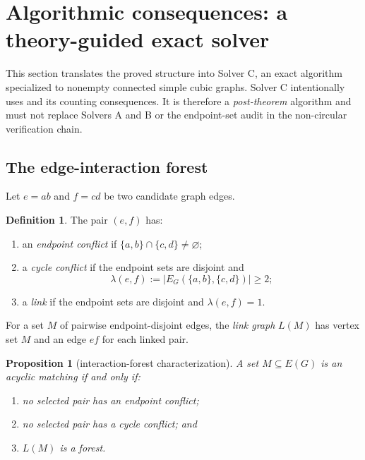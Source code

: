 \documentclass[smallextended,natbib,nospthms]{svjour3}
\newtheorem{proposition}[proposition]{Proposition}
\theoremstyle{definition}
\newtheorem{definition}[definition]{Definition}
\theoremstyle{remark}
\begin{document}
\section{Algorithmic consequences: a theory-guided exact solver}
\label{sec:solverc}

This section translates the proved structure into Solver C, an exact algorithm
specialized to nonempty connected simple cubic graphs. Solver C intentionally
uses  and its counting consequences. It is therefore a
\emph{post-theorem} algorithm and must not replace Solvers A and B or the
endpoint-set audit in the non-circular verification chain.

\subsection{The edge-interaction forest}

Let $e=ab$ and $f=cd$ be two candidate graph edges.
\begin{definition}
\label{def:interactions}
The pair $(e,f)$ has:
\begin{enumerate}[label=(\roman*),leftmargin=2em]
  \item an \emph{endpoint conflict} if
  $\{a,b\}\cap\{c,d\}\neq\varnothing$;
  \item a \emph{cycle conflict} if the endpoint sets are disjoint and
  \[
    \lambda(e,f)
    :=|E_G(\{a,b\},\{c,d\})|\geq 2;
  \]
  \item a \emph{link} if the endpoint sets are disjoint and
  $\lambda(e,f)=1$.
\end{enumerate}
For a set $M$ of pairwise endpoint-disjoint edges, the \emph{link graph}
$L(M)$ has vertex set $M$ and an edge $ef$ for each linked pair.
\end{definition}

\begin{proposition}[interaction-forest characterization]
\label{prop:interaction-forest}
A set $M\subseteq E(G)$ is an acyclic matching if and only if:
\begin{enumerate}[label=(\roman*),leftmargin=2em]
  \item no selected pair has an endpoint conflict;
  \item no selected pair has a cycle conflict; and
  \item $L(M)$ is a forest.
\end{enumerate}
\end{proposition}
\end{document}
